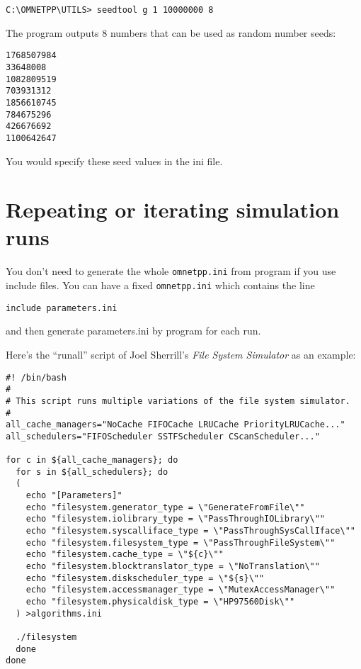 \begin{verbatim}
C:\OMNETPP\UTILS> seedtool g 1 10000000 8
\end{verbatim}


The program outputs 8 numbers that can be used as random number
seeds:

\begin{verbatim}
1768507984
33648008
1082809519
703931312
1856610745
784675296
426676692
1100642647
\end{verbatim}


You would specify these seed values in the ini file.



\section{Repeating or iterating simulation runs}

%
%



You don't need to generate the whole \texttt{omnetpp.ini} from program if you
use include files. You can have a fixed
\texttt{omnetpp.ini} which contains the line

\begin{verbatim}
include parameters.ini
\end{verbatim}

and then generate parameters.ini by program for each run.


Here's the ``runall'' script of Joel Sherrill's \textit{File
System Simulator} as an example:

\begin{verbatim}
#! /bin/bash
#
# This script runs multiple variations of the file system simulator.
#
all_cache_managers="NoCache FIFOCache LRUCache PriorityLRUCache..."
all_schedulers="FIFOScheduler SSTFScheduler CScanScheduler..."

for c in ${all_cache_managers}; do
  for s in ${all_schedulers}; do
  (
    echo "[Parameters]"
    echo "filesystem.generator_type = \"GenerateFromFile\""
    echo "filesystem.iolibrary_type = \"PassThroughIOLibrary\""
    echo "filesystem.syscalliface_type = \"PassThroughSysCallIface\""
    echo "filesystem.filesystem_type = \"PassThroughFileSystem\""
    echo "filesystem.cache_type = \"${c}\""
    echo "filesystem.blocktranslator_type = \"NoTranslation\""
    echo "filesystem.diskscheduler_type = \"${s}\""
    echo "filesystem.accessmanager_type = \"MutexAccessManager\""
    echo "filesystem.physicaldisk_type = \"HP97560Disk\""
  ) >algorithms.ini

  ./filesystem
  done
done
\end{verbatim}

